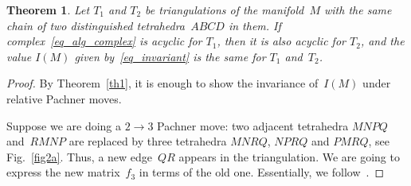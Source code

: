 \documentclass[11pt]{article}
\newtheorem{theorem}{Theorem}
\begin{document}
\begin{theorem}
Let $T_1$ and $T_2$ be triangulations of the manifold~$M$ with the same chain of two distinguished tetrahedra~$ABCD$ in them. If complex~\eqref{eq_alg_complex} is acyclic for $T_1$, then it is also acyclic for $T_2$, and the value $I(M)$ given by~\eqref{eq_invariant} is the same for $T_1$ and~$T_2$.
\label{th3}
\end{theorem}

\begin{proof}
By Theorem~\ref{th1}, it is enough to show the invariance of~$I(M)$ under relative Pachner moves.

Suppose we are doing a $2\to 3$ Pachner move: two adjacent tetrahedra $MNPQ$ and~$RMNP$ are replaced by three tetrahedra $MNRQ$, $NPRQ$
and $PMRQ$, see Fig.~\ref{fig2a}. Thus, a new edge~$QR$ appears in the triangulation. We are going to express the new matrix~$f_3$ in terms of the old one. Essentially, we follow~\cite[Section~4]{JNMP1}.


\end{proof}
\end{document}
